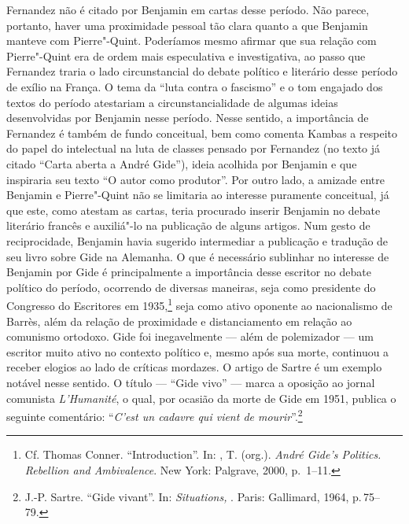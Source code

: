 Fernandez não é citado por Benjamin em cartas desse período. Não parece,
portanto, haver uma proximidade pessoal tão clara quanto a que Benjamin
manteve com Pierre"-Quint. Poderíamos mesmo afirmar que sua relação com
Pierre"-Quint era de ordem mais especulativa e investigativa, ao passo
que Fernandez traria o lado circunstancial do debate político e
literário desse período de exílio na França. O tema da ``luta contra o
fascismo'' e o tom engajado dos textos do período atestariam a
circunstancialidade de algumas ideias desenvolvidas por Benjamin nesse
período. Nesse sentido, a importância de Fernandez é também de fundo
conceitual, bem como comenta Kambas a respeito do papel do intelectual
na luta de classes pensado por Fernandez (no texto já citado ``Carta
aberta a André Gide''), ideia acolhida por Benjamin e que inspiraria seu
texto ``O autor como produtor''. Por outro lado, a amizade entre
Benjamin e Pierre"-Quint não se limitaria ao interesse puramente
conceitual, já que este, como atestam as cartas, teria procurado
inserir Benjamin no debate literário francês e auxiliá"-lo na publicação
de alguns artigos. Num gesto de reciprocidade, Benjamin havia sugerido intermediar a publicação e tradução de seu livro sobre Gide na Alemanha. O que é
necessário sublinhar no interesse de Benjamin por Gide é
principalmente a importância desse escritor no debate político do
período, ocorrendo de diversas maneiras, seja como presidente do
Congresso do Escritores em 1935,\footnote{Cf. Thomas Conner.
  ``Introduction''. In: , T. (org.). \emph{André Gide's Politics.
  Rebellion and Ambivalence}. New York: Palgrave, 2000, p.~1--11.} seja
como ativo oponente ao nacionalismo de Barrès, além da relação de
proximidade e distanciamento em relação ao comunismo ortodoxo. Gide foi
inegavelmente --- além de polemizador --- um escritor muito ativo no
contexto político e, mesmo após sua morte, continuou a receber elogios
ao lado de críticas mordazes. O artigo de Sartre é um exemplo notável
nesse sentido. O título --- ``Gide vivo'' --- marca a oposição ao jornal
comunista \emph{L'Humanité}, o qual, por ocasião da morte de Gide em
1951, publica o seguinte comentário: ``\emph{C'est un cadavre qui vient de
mourir}''.\footnote{J.-P. Sartre. ``Gide vivant''. In: \emph{Situations, }. Paris: Gallimard, 1964, p.\,75--79.}

